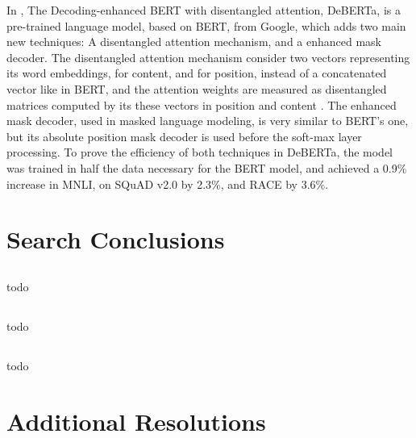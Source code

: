 In \citet{He202003654}, The Decoding-enhanced BERT with disentangled attention, DeBERTa, is a pre-trained language model, based on BERT, from Google, which adds two main new techniques: A disentangled attention mechanism, and a enhanced mask decoder. The disentangled attention mechanism consider two vectors representing its word embeddings, for content, and for position, instead of a concatenated vector like in BERT, and the attention weights are measured as disentangled matrices computed by its these vectors in position and content . The enhanced mask decoder, used in masked language modeling, is very similar to BERT’s one, but its absolute position mask decoder is used before the soft-max layer processing. To prove the efficiency of both techniques in DeBERTa, the model was trained in half the data necessary for the BERT model, and achieved a 0.9\% increase in MNLI, on SQuAD v2.0 by 2.3\%, and RACE by 3.6\%.

\section{Search Conclusions}

\subsection{\RQI}

todo

\subsection{\RQII}

todo

\subsection{\RQIII}

todo

\section{Additional Resolutions}




